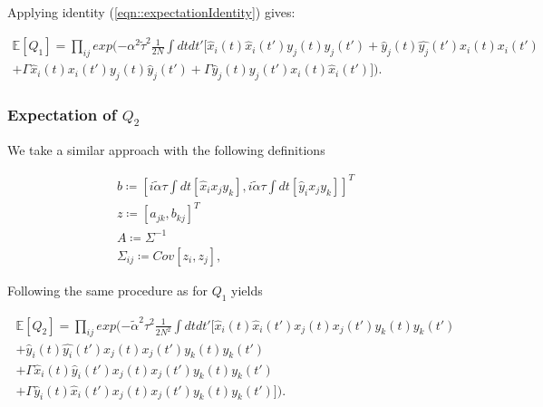 \documentclass{article}
\begin{document}
	Applying identity (\ref{eqn::expectationIdentity}) gives:

	\begin{equation}
	\begin{split}
		\mathbb{E}[Q_1] = \prod_{ij} exp(- \alpha^2 \tilde{\tau}^2 \frac{1}{2N} \int dt dt'[
		\hat{x}_i
		(t) \hat{x}_i
		(t') y_j(t) y_j(t') + \hat{y}_j(t) \hat{y_j}(t') x_i(t) x_i(t') \\ + \Gamma \hat{x}_i(t) 
		{x}_i
		(t') {y}_j(t) \hat{y}_j(t') + \Gamma \hat{y}_j(t) {y}_j(t') {x}_i(t) \hat{x}_i(t')]).
	\end{split}
	\end{equation}


	\subsubsection{Expectation of $Q_2$} %
	\label{ssub:expectation_of_Q2}
	
	We take a similar approach with the following definitions

	\begin{equation*}
		\begin{split}
			b \coloneqq [i \tilde{\alpha} \tau \int dt[\hat{x}_i x_j y_k], i \tilde{\alpha} 
			\tau
			\int
			dt[\hat{y}_i x_j y_k]]^T \\
			z \coloneqq [a_{jk}, b_{kj}]^T\\
			A \coloneqq \Sigma^{-1}\\
			\Sigma_{ij} \coloneqq Cov[z_i, z_j],
		\end{split}
	\end{equation*}


	Following the same procedure as for $Q_1$ yields

	\begin{equation}
	\begin{split}
		\mathbb{E}[Q_2] = \prod_{ij} exp(- \tilde{\alpha}^2 \tau^2 \frac{1}{2N^2} \int dt dt'[
		\hat{x}_i
		(t) \hat{x}_i
		(t') x_j(t) x_j(t') y_k(t) y_k(t') \\+ \hat{y}_i(t) \hat{y_i}(t') x_j(t) x_j(t') y_k(t)
		y_k(t') \\ + \Gamma \hat{x}_i(t) \hat{y}_i(t')
		{x}_j
		(t) x_j{(t')} {y}_k(t) y_k(t') \\ + \Gamma \hat{y}_i(t) \hat{x}_i(t') {x}_j(t) {x}_j(t')
		y_k(t) y_k(t')]).
	\end{split}
	\end{equation}
\end{document}
